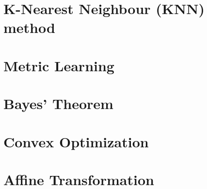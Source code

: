 \section{K-Nearest Neighbour (KNN) method}


\section{Metric Learning}


\section{Bayes' Theorem}


\section{Convex Optimization}


\section{Affine Transformation}



